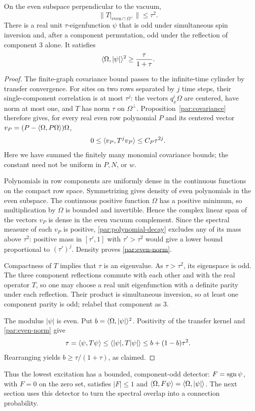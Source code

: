 \begin{proposition}\label{par:even-gap}
On the even subspace perpendicular to the vacuum,
\begin{equation}\label{par:even-norm}
          \bigl\|T\big|_{\mathrm{even}\cap\Omega^\perp}\bigr\|
                         \le\tau^2.
\end{equation}
There is a real unit $\tau$-eigenfunction $\psi$ that is odd under
simultaneous spin inversion and, after a component permutation, odd under
the reflection of component $3$ alone. It satisfies
\begin{equation}\label{par:overlap}
                    \langle \Omega,|\psi|\rangle^2\ge\frac{\tau}{1+\tau}.
\end{equation}
\end{proposition}

\begin{proof}
The finite-graph covariance bound passes to the infinite-time cylinder
by transfer convergence. For sites on two rows separated by $j$ time
steps, their single-component correlation is at most $\tau^j$: the vectors
$q_x^i\Omega$ are centered, have norm at most one, and $T$ has norm $\tau$
on $\Omega^\perp$. Proposition~\ref{par:covariance} therefore gives, for
every real even row polynomial $P$ and its centered vector
$v_P=(P-\langle \Omega,P\Omega\rangle)\Omega$,
\begin{equation}\label{par:polynomial-decay}
                   0\le\langle v_P,T^jv_P\rangle\le C_P\tau^{2j}.
\end{equation}
Here we have summed the finitely many monomial covariance bounds; the
constant need not be uniform in $P,N$, or $w$.

Polynomials in row components are uniformly dense in the continuous
functions on the compact row space. Symmetrizing gives density of even
polynomials in the even subspace. The continuous positive function
$\Omega$ has a positive minimum, so multiplication by $\Omega$ is bounded
and invertible. Hence the complex linear span of the vectors $v_P$ is dense in the even
vacuum complement. Since the spectral measure of each $v_P$ is positive,
\eqref{par:polynomial-decay} excludes any of its mass above $\tau^2$:
positive mass in $[\tau',1]$ with $\tau'>\tau^2$ would give a lower bound
proportional to $(\tau')^j$. Density proves \eqref{par:even-norm}.

Compactness of $T$ implies that $\tau$ is an eigenvalue. As $\tau>\tau^2$,
its eigenspace is odd. The three component reflections commute with each
other and with the real operator $T$, so one may choose a real unit
eigenfunction with a definite parity under each reflection. Their product
is simultaneous inversion, so at least one component parity is odd;
relabel that component as $3$.

The modulus $|\psi|$ is even. Put $b=\langle \Omega,|\psi|\rangle^2$. Positivity
of the transfer kernel and \eqref{par:even-norm} give
\[
 \tau=\langle \psi,T\psi\rangle
       \le\langle |\psi|,T|\psi|\rangle
       \le b+(1-b)\tau^2.
\]
Rearranging yields $b\ge\tau/(1+\tau)$, as claimed.
\end{proof}

Thus the lowest excitation has a bounded, component-odd detector:
$F=\operatorname{sgn}\psi$, with $F=0$ on the zero set, satisfies $|F|\le1$ and
$\langle \Omega,F\psi\rangle=\langle \Omega,|\psi|\rangle$. The next section uses
this detector to turn the spectral overlap into a connection probability.
